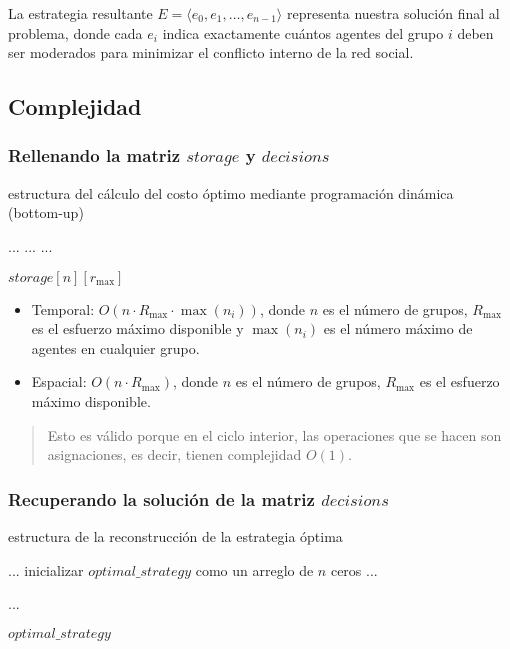 La estrategia resultante $E = \langle e_0,e_1,\ldots,e_{ n - 1 } \rangle$ representa nuestra solución final al problema, donde cada $e_i$ indica exactamente cuántos agentes del grupo $i$ deben ser moderados para minimizar el conflicto interno de la red social.

\subsection{Complejidad}

\subsubsection{Rellenando la matriz $storage$ y $decisions$}

\begin{algorithm}[H]
	\caption{estructura del cálculo del costo óptimo mediante programación dinámica (bottom-up)}
	\begin{algorithmic}[1]
		\State ...
			\State ...
					\State ...
				\EndFor
			\EndFor
		\EndFor

		\State \Return $storage[n][r_{ \max }]$
	\end{algorithmic}
\end{algorithm}

\begin{itemize}
	\item Temporal: $O(n \cdot R_{ \max } \cdot \max(n_i))$, donde $n$ es el número de grupos, $R_{ \max }$ es el esfuerzo máximo disponible y $\max(n_i)$ es el número máximo de agentes en cualquier grupo.

	\item Espacial: $O(n \cdot R_{ \max })$, donde $n$ es el número de grupos, $R_{ \max }$ es el esfuerzo máximo disponible.
\end{itemize}

\begin{quote}
	Esto es válido porque en el ciclo interior, las operaciones que se hacen son asignaciones, es decir, tienen complejidad $O(1)$.
\end{quote}

\subsubsection{Recuperando la solución de la matriz $decisions$}

\begin{algorithm}[H]
	\caption{estructura de la reconstrucción de la estrategia óptima}
	\begin{algorithmic}[1]
		\State ...
		\State inicializar $optimal\_strategy$ como un arreglo de $n$ ceros
		\State ...

			\State ...
		\EndFor

		\State \Return $optimal\_strategy$
	\end{algorithmic}
\end{algorithm}

